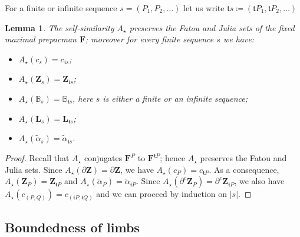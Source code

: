 \documentclass{amsart}
\newcommand{\1}{{\mathbb 1 }}
\newcommand{\bB}{{\mathbb{B}}}
\newcommand{\bF}{{\mathbf F}}
\newcommand{\bZ}{{\mathbf Z}}
\newcommand{\bL}{{\mathbf L}}
\newcommand{\str}{{\star}}
\renewcommand{\tt}{\mathfrak{t}}
\newtheorem{lem}[thm]{Lemma}
\theoremstyle{remark}
\numberwithin{equation}{section}
\theoremstyle{definition}
\theoremstyle{nonumberbreak}
\begin{document}
For a finite or infinite sequence $s=(P_1,P_2,\dots)$ let us write $\tt s\coloneqq (\tt P_1,\tt P_2,\dots )$
\begin{lem}
\label{lem:prop of Astr}
The self-similarity $A_\str$ preserves the Fatou and Julia sets of the fixed maximal prepacman $\bF$; moreover for every finite sequence $s$ we have:
\begin{itemize}
\item $A_\str(c_s)=c_{\tt s}$;
\item $A_\str(\bZ_s)=\bZ_{\tt s}$;
\item $A_\str(\bB_s)=\bB_{\tt s}$, here $s$ is either a finite or an infinite sequence;
\item $A_\str(\bL_s)=\bL_{\tt s}$; 
\item $A_\str(\widetilde \alpha_s)=\widetilde \alpha_{\tt s}$.
\end{itemize}
\end{lem}
\begin{proof}
Recall that $A_\str$ conjugates $\bF^P$ to $\bF^{\tt P}$; hence $A_\str$ preserves the Fatou and Julia sets. Since $A_\str (\partial \bZ)=\partial \bZ$, we have $A_\str(c_P)=c_{\tt P}$. As a consequence, $A_\str (\bZ_{P})=\bZ_{\tt P}$ and $A_\str(\widetilde \alpha_P)=\widetilde \alpha_{\tt P}$. Since $A_\str (\partial^c \bZ_{P})=\partial^c \bZ_{\tt P}$, we also have $A_{\str}(c_{(P,Q)})=c_{(\tt P, \tt Q)}$ and we can proceed by induction on $|s|$.
\end{proof}




\subsection{Boundedness of limbs}
\end{document}
